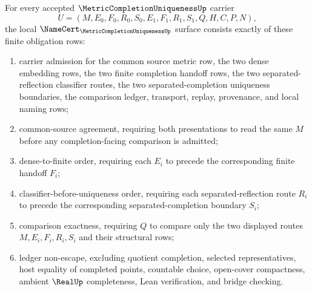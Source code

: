 \begin{theorem}
\label{thm:metric-completion-uniqueness-namecert-obligations}
For every accepted $\MetricCompletionUniquenessUp$ carrier
$$
U=(M,E_0,F_0,R_0,S_0,E_1,F_1,R_1,S_1,Q,H,C,P,N),
$$
the local $\NameCert_{\MetricCompletionUniquenessUp}$ surface consists exactly of these finite obligation rows:
\begin{enumerate}
\item carrier admission for the common source metric row, the two dense embedding rows, the two finite completion handoff rows, the two separated-reflection classifier routes, the two separated-completion uniqueness boundaries, the comparison ledger, transport, replay, provenance, and local naming rows;
\item common-source agreement, requiring both presentations to read the same $M$ before any completion-facing comparison is admitted;
\item dense-to-finite order, requiring each $E_i$ to precede the corresponding finite handoff $F_i$;
\item classifier-before-uniqueness order, requiring each separated-reflection route $R_i$ to precede the corresponding separated-completion boundary $S_i$;
\item comparison exactness, requiring $Q$ to compare only the two displayed routes $M,E_i,F_i,R_i,S_i$ and their structural rows;
\item ledger non-escape, excluding quotient completion, selected representatives, host equality of completed points, countable choice, open-cover compactness, ambient $\RealUp$ completeness, Lean verification, and bridge checking.
\end{enumerate}
\end{theorem}
